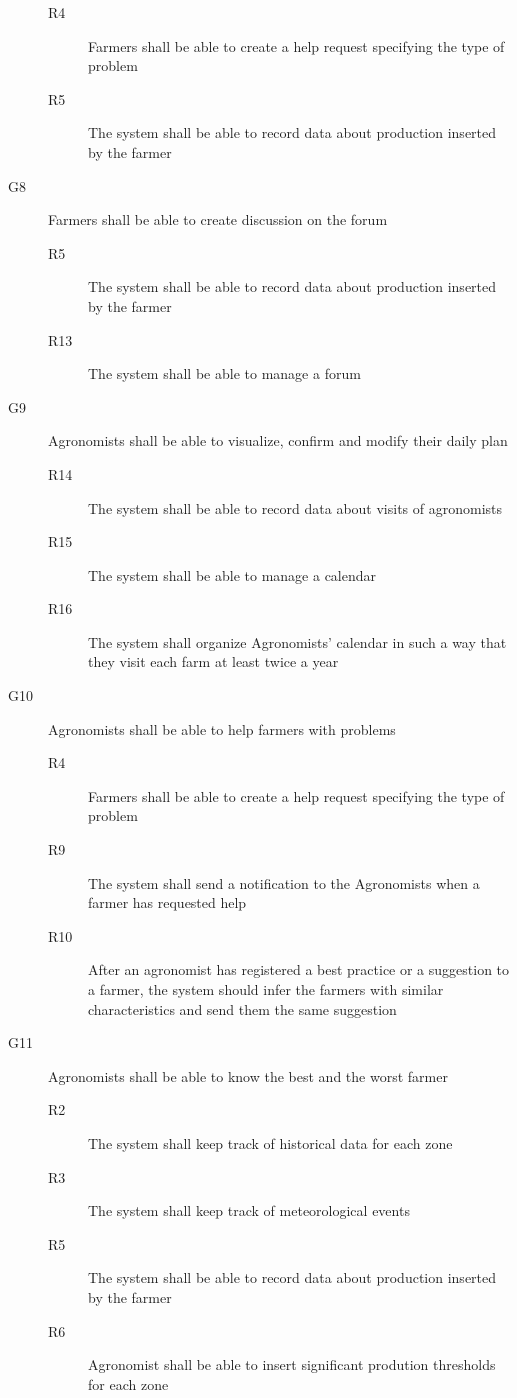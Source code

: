\begin{description}
        \begin{description}
            \item[R4] Farmers shall be able to create a help request specifying  the type of problem
            \item[R5] The system shall be able to record data about production inserted by the farmer
        \end{description}
    \item [G8] Farmers shall be able to create discussion on the forum
        \begin{description}
            \item[R5] The system shall be able to record data about production inserted by the farmer
            \item[R13] The system shall be able to manage a forum
        \end{description}
    \item [G9] Agronomists shall be able to visualize, confirm and modify their daily plan
        \begin{description}
            \item[R14] The system shall be able to record data about visits of agronomists
            \item[R15] The system shall be able to manage a calendar
            \item[R16] The system shall organize Agronomists' calendar in such a way that they visit each farm at least twice a year
        \end{description}
    \item [G10] Agronomists shall be able to help farmers with problems
    \begin{description}
        \item[R4] Farmers shall be able to create a help request specifying  the type of problem
        \item[R9] The system shall send a notification to the Agronomists when a farmer has requested help
        \item[R10] After an agronomist has registered a best practice or a suggestion to a farmer, the system should infer the farmers with similar characteristics and send them the same suggestion 
    \end{description}
    \item [G11] Agronomists shall be able to know the best and the worst farmer
    \begin{description}
        \item[R2] The system shall keep track of historical data for each zone
        \item[R3] The system shall keep track of meteorological events
        \item[R5] The system shall be able to record data about production inserted by the farmer
        \item[R6] Agronomist shall be able to insert significant prodution thresholds for each zone   
    \end{description}
\end{description}

